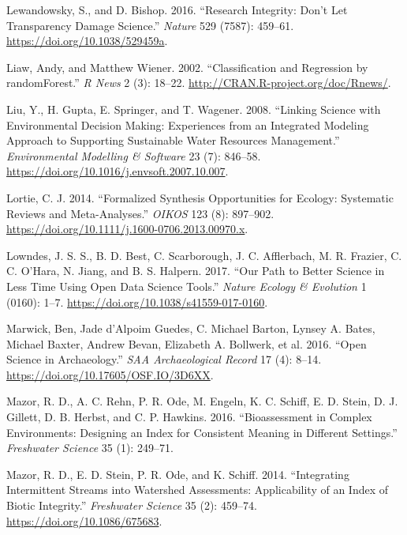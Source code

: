 \documentclass[fleqn,10pt,lineno]{wlpeerj} %
\begin{document}
\leavevmode\hypertarget{ref-Lewandowsky16}{}%
Lewandowsky, S., and D. Bishop. 2016. ``Research Integrity: Don't Let Transparency Damage Science.'' \emph{Nature} 529 (7587): 459--61. \url{https://doi.org/10.1038/529459a}.

\leavevmode\hypertarget{ref-Liaw02}{}%
Liaw, Andy, and Matthew Wiener. 2002. ``Classification and Regression by randomForest.'' \emph{R News} 2 (3): 18--22. \url{http://CRAN.R-project.org/doc/Rnews/}.

\leavevmode\hypertarget{ref-Liu08}{}%
Liu, Y., H. Gupta, E. Springer, and T. Wagener. 2008. ``Linking Science with Environmental Decision Making: Experiences from an Integrated Modeling Approach to Supporting Sustainable Water Resources Management.'' \emph{Environmental Modelling \& Software} 23 (7): 846--58. \url{https://doi.org/10.1016/j.envsoft.2007.10.007}.

\leavevmode\hypertarget{ref-Lortie14}{}%
Lortie, C. J. 2014. ``Formalized Synthesis Opportunities for Ecology: Systematic Reviews and Meta-Analyses.'' \emph{OIKOS} 123 (8): 897--902. \url{https://doi.org/10.1111/j.1600-0706.2013.00970.x}.

\leavevmode\hypertarget{ref-Lowndes17}{}%
Lowndes, J. S. S., B. D. Best, C. Scarborough, J. C. Afflerbach, M. R. Frazier, C. C. O'Hara, N. Jiang, and B. S. Halpern. 2017. ``Our Path to Better Science in Less Time Using Open Data Science Tools.'' \emph{Nature Ecology \& Evolution} 1 (0160): 1--7. \url{https://doi.org/10.1038/s41559-017-0160}.

\leavevmode\hypertarget{ref-Marwick16}{}%
Marwick, Ben, Jade d'Alpoim Guedes, C. Michael Barton, Lynsey A. Bates, Michael Baxter, Andrew Bevan, Elizabeth A. Bollwerk, et al. 2016. ``Open Science in Archaeology.'' \emph{SAA Archaeological Record} 17 (4): 8--14. \url{https://doi.org/10.17605/OSF.IO/3D6XX}.

\leavevmode\hypertarget{ref-Mazor16}{}%
Mazor, R. D., A. C. Rehn, P. R. Ode, M. Engeln, K. C. Schiff, E. D. Stein, D. J. Gillett, D. B. Herbst, and C. P. Hawkins. 2016. ``Bioassessment in Complex Environments: Designing an Index for Consistent Meaning in Different Settings.'' \emph{Freshwater Science} 35 (1): 249--71.

\leavevmode\hypertarget{ref-Mazor14}{}%
Mazor, R. D., E. D. Stein, P. R. Ode, and K. Schiff. 2014. ``Integrating Intermittent Streams into Watershed Assessments: Applicability of an Index of Biotic Integrity.'' \emph{Freshwater Science} 35 (2): 459--74. \url{https://doi.org/10.1086/675683}.
\end{document}
